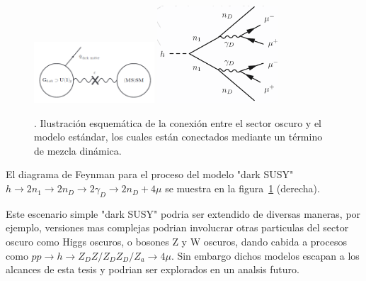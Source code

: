 \begin{figure}
    \centering
    \includegraphics[width=0.4\textwidth]{HIPOTESIS/sketch_darksector.png}
    \includegraphics[width=0.4\textwidth]{HIPOTESIS/darksusy_feynman.png}
    \caption{. Ilustración esquemática de la conexión entre el sector oscuro y el modelo estándar, los cuales están conectados mediante un término de mezcla dinámica.}
    \label{fig:sketch_darksector}
\end{figure}


El diagrama de Feynman para el proceso del modelo "dark SUSY" $h\rightarrow 2n_{1}\rightarrow 2n_{D}\rightarrow 2\gamma_{D} \rightarrow 2n_{D} + 4\mu$ se muestra en la figura~\ref{fig:sketch_darksector} (derecha). 

Este escenario simple "dark SUSY" podria ser extendido de diversas maneras, por ejemplo, versiones mas complejas podrian involucrar otras particulas del sector oscuro como Higgs oscuros, o bosones Z y W oscuros, dando cabida a procesos como $pp\rightarrow h \rightarrow Z_{D}Z/Z_{D}Z_{D}/Z_{a}\rightarrow 4\mu$. Sin embargo dichos modelos escapan a los alcances de esta tesis y podrian ser explorados en un analsis futuro. 















